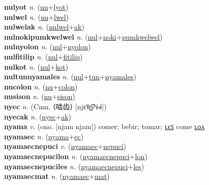 \textbf{nulyot} \textit{n.} (\hyperref[nu]{nu}+\hyperref[lyot]{lyot})
 \label{nulyot} \\
\textbf{nulwel} \textit{n.} (\hyperref[nu]{nu}+\hyperref[lwel]{lwel})
 \label{nulwel} \\
\textbf{nulwelak} \textit{n.} (\hyperref[nulwel]{nulwel}+\hyperref[ak]{ak})
 \label{nulwelak} \\
\textbf{nulnokipumkwelwel} \textit{n.} (\hyperref[nul]{nul}+\hyperref[noki]{noki}+\hyperref[pumkwelwel]{pumkwelwel})
 \label{nulnokipumkwelwel} \\
\textbf{nulnyolon} \textit{n.} (\hyperref[nul]{nul}+\hyperref[nyolon]{nyolon})
 \label{nulnyolon} \\
\textbf{nulfitilip} \textit{n.} (\hyperref[nul]{nul}+\hyperref[fitilip]{fitilip})
 \label{nulfitilip} \\
\textbf{nulkot} \textit{n.} (\hyperref[nul]{nul}+\hyperref[kot]{kot})
 \label{nulkot} \\
\textbf{nultunnyamales} \textit{n.} (\hyperref[nul]{nul}+\hyperref[tun]{tun}+\hyperref[nyamales]{nyamales})
 \label{nultunnyamales} \\
\textbf{nucolon} \textit{n.} (\hyperref[nu]{nu}+\hyperref[colon]{colon})
 \label{nucolon} \\
\textbf{nusison} \textit{n.} (\hyperref[nu]{nu}+\hyperref[sison]{sison})
 \label{nusison} \\
\textbf{nyec} \textit{n.} (Cmn. ⟨啮齿⟩ [njɛ˥˩ʈ͡ʂʰɨ˧˩˧])
 \label{nyec} \\
\textbf{nyecak} \textit{n.} (\hyperref[nyec]{nyec}+\hyperref[ak]{ak})
 \label{nyecak} \\
\textbf{nyama} \textit{v.} (ono. [njam njam])
comer; bebir; tomar; \hyperref[nyamales]{ʟєꜱ} come \hyperref[nyamalon]{ʟᴏᴧ} \label{nyama} \\
\textbf{nyamaec} \textit{n.} (\hyperref[nyama]{nyama}+\hyperref[ec]{ec})
 \label{nyamaec} \\
\textbf{nyamaecnepuci} \textit{v.} (\hyperref[nyamaec]{nyamaec}+\hyperref[nepuci]{nepuci})
 \label{nyamaecnepuci} \\
\textbf{nyamaecnepucilon} \textit{n.} (\hyperref[nyamaecnepuci]{nyamaecnepuci}+\hyperref[lon]{lon})
 \label{nyamaecnepucilon} \\
\textbf{nyamaecnepuciles} \textit{n.} (\hyperref[nyamaecnepuci]{nyamaecnepuci}+\hyperref[les]{les})
 \label{nyamaecnepuciles} \\
\textbf{nyamaecmat} \textit{n.} (\hyperref[nyamaec]{nyamaec}+\hyperref[mat]{mat})
 \label{nyamaecmat} \\
